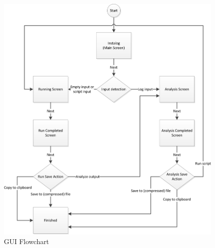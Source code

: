 \begin{figure}[h!]
  	\centering
	\includegraphics{figures/gui/GUI_Flowchart.png}
  	\caption{GUI Flowchart}
  	\label{fig:gui_flowchart}
\end{figure}